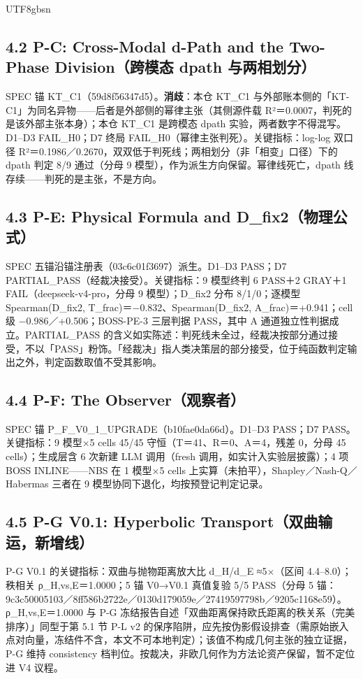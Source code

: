 \documentclass[10pt,a4paper]{article}
\begin{document}
\begin{CJK}{UTF8}{gbsn}
\subsection*{4.2 P-C: Cross-Modal d-Path and the Two-Phase Division（跨模态 dpath 与两相划分）}SPEC 锚 KT\_C1（59d8f56347d5）。\textbf{消歧}：本仓 KT\_C1 与外部账本侧的「KT-C1」为同名异物——后者是外部侧的幂律主张（其侧源件载 R²＝0.0007，判死的是该外部主张本身）；本仓 KT\_C1 是跨模态 dpath 实验，两者数字不得混写。D1–D3 FAIL\_H0；D7 终局 FAIL\_H0（幂律主张判死）。关键指标：log-log 双口径 R²＝0.1986／0.2670，双双低于判死线；两相划分（非「相变」口径）下的 dpath 判定 8/9 通过（分母 9 模型），作为派生方向保留。幂律线死亡，dpath 线存续——判死的是主张，不是方向。

\subsection*{4.3 P-E: Physical Formula and D\_fix2（物理公式）}SPEC 五锚沿锚注册表（03c6c01f3697）派生。D1–D3 PASS；D7 PARTIAL\_PASS（经裁决接受）。关键指标：9 模型终判 6 PASS＋2 GRAY＋1 FAIL（deepseek-v4-pro，分母 9 模型）；D\_fix2 分布 8/1/0；逐模型 Spearman(D\_fix2, T\_frac)＝−0.832、Spearman(D\_fix2, A\_frac)＝+0.941；cell 级 −0.986／+0.506；BOSS-PE-3 三层判据 PASS，其中 A 通道独立性判据成立。PARTIAL\_PASS 的含义如实陈述：判死线未全过，经裁决按部分通过接受，不以「PASS」粉饰。「经裁决」指人类决策层的部分接受，位于纯函数判定输出之外，判定函数取值不受其影响。

\subsection*{4.4 P-F: The Observer（观察者）}SPEC 锚 P\_F\_V0\_1\_UPGRADE（b10fae0da66d）。D1–D3 PASS；D7 PASS。关键指标：9 模型×5 cells 45/45 守恒（T＝41、R＝0、A＝4，残差 0，分母 45 cells）；生成层含 6 次新建 LLM 调用（fresh 调用，如实计入实验层披露）；4 项 BOSS INLINE——NBS 在 1 模型×5 cells 上实算（未拍平），Shapley／Nash-Q／Habermas 三者在 9 模型协同下退化，均按预登记判定记录。

\subsection*{4.5 P-G V0.1: Hyperbolic Transport（双曲输运，新增线）}P-G V0.1 的关键指标：双曲与抛物距离放大比 d\_H/d\_E ≈5×（区间 4.4–8.0）；秩相关 ρ\_H,vs,E＝1.0000；5 锚 V0→V0.1 真值复验 5/5 PASS（分母 5 锚：9c3c50005103／8ff586b2722e／0130d179059e／27419597798b／9205c1168e59）。ρ\_H,vs,E＝1.0000 与 P-G 冻结报告自述「双曲距离保持欧氏距离的秩关系（完美排序）」同型于第 5.1 节 P-L v2 的保序陷阱，应先按伪影假设排查（需原始嵌入点对向量，冻结件不含，本文不可本地判定）；该值不构成几何主张的独立证据，P-G 维持 consistency 档判位。按裁决，非欧几何作为方法论资产保留，暂不定位进 V4 议程。


\end{CJK}
\end{document}
